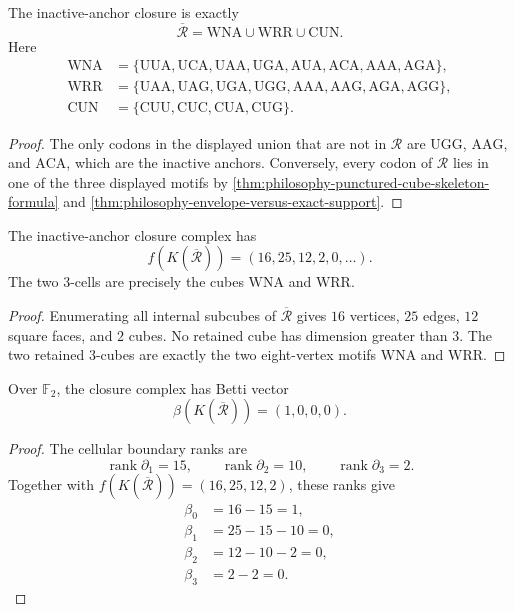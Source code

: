 \begin{theorem}
\label{thm:philosophy-inactive-anchor-closure-formula}
The inactive-anchor closure is exactly
$$
  \overline{\mathcal{R}}
  =
  \mathrm{WNA}\cup\mathrm{WRR}\cup\mathrm{CUN}.
$$
Here
$$
\begin{aligned}
  \mathrm{WNA}
    &=
    \{\mathrm{UUA},\mathrm{UCA},\mathrm{UAA},\mathrm{UGA},
      \mathrm{AUA},\mathrm{ACA},\mathrm{AAA},\mathrm{AGA}\},\\
  \mathrm{WRR}
    &=
    \{\mathrm{UAA},\mathrm{UAG},\mathrm{UGA},\mathrm{UGG},
      \mathrm{AAA},\mathrm{AAG},\mathrm{AGA},\mathrm{AGG}\},\\
  \mathrm{CUN}
    &=
    \{\mathrm{CUU},\mathrm{CUC},\mathrm{CUA},\mathrm{CUG}\}.
\end{aligned}
$$
\end{theorem}
\begin{proof}
The only codons in the displayed union that are not in $\mathcal{R}$
are $\mathrm{UGG}$, $\mathrm{AAG}$, and $\mathrm{ACA}$, which are the
inactive anchors. Conversely, every codon of $\mathcal{R}$ lies in one
of the three displayed motifs by
\autoref{thm:philosophy-punctured-cube-skeleton-formula} and
\autoref{thm:philosophy-envelope-versus-exact-support}.
\end{proof}

\begin{theorem}
\label{thm:philosophy-closure-cubical-f-vector}
The inactive-anchor closure complex has
$$
  f(K(\overline{\mathcal{R}}))=(16,25,12,2,0,\ldots).
$$
The two $3$-cells are precisely the cubes $\mathrm{WNA}$ and
$\mathrm{WRR}$.
\end{theorem}
\begin{proof}
Enumerating all internal subcubes of
$\overline{\mathcal{R}}$ gives $16$ vertices, $25$ edges, $12$ square
faces, and $2$ cubes. No retained cube has dimension greater than $3$.
The two retained $3$-cubes are exactly the two eight-vertex motifs
$\mathrm{WNA}$ and $\mathrm{WRR}$.
\end{proof}

\begin{theorem}
\label{thm:philosophy-closure-cubical-homology}
Over $\mathbb{F}_{2}$, the closure complex has Betti vector
$$
  \beta(K(\overline{\mathcal{R}}))=(1,0,0,0).
$$
\end{theorem}
\begin{proof}
The cellular boundary ranks are
$$
  \operatorname{rank}\partial_{1}=15,\qquad
  \operatorname{rank}\partial_{2}=10,\qquad
  \operatorname{rank}\partial_{3}=2.
$$
Together with
$f(K(\overline{\mathcal{R}}))=(16,25,12,2)$, these ranks give
$$
\begin{aligned}
  \beta_{0}&=16-15=1,\\
  \beta_{1}&=25-15-10=0,\\
  \beta_{2}&=12-10-2=0,\\
  \beta_{3}&=2-2=0.
\end{aligned}
$$
\end{proof}


